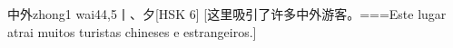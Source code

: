 \begin{EntryWithPhonetic}{中外}{zhong1 wai4}{4,5}{⼁、⼣}[HSK 6]
  [这里吸引了许多中外游客。===Este lugar atrai muitos turistas chineses e estrangeiros.]
\end{EntryWithPhonetic}

